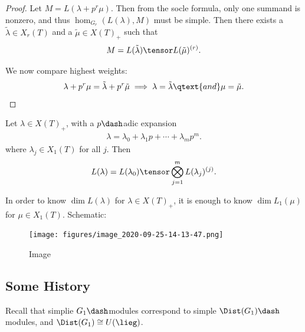 \begin{proof}

Let \(M = L(\lambda + p^r \mu)\). Then from the socle formula, only one
summand is nonzero, and thus \(\hom_{G_r}(L(\lambda), M)\) must be
simple. Then there exists a \(\tilde \lambda \in X_r(T)\) and a
\(\tilde \mu \in X(T)_+\) such that
\begin{align*}  
M = L(\tilde \lambda) \tensor L(\tilde\mu)^{(r)}
.\end{align*}

We now compare highest weights:
\begin{align*}  
\lambda + p^r \mu = \tilde \lambda + p^r \tilde \mu \implies \lambda = \tilde \lambda \qtext{and} \mu = \tilde \mu
.\end{align*}

\end{proof}

\begin{theorem}[Steinberg]

Let \(\lambda \in X(T)_+\), with a \(p\dash\)adic expansion
\begin{align*}  
\lambda = \lambda_0 + \lambda_1 p + \cdots + \lambda_m p^m
.\end{align*} where \(\lambda_j \in X_1(T)\) for all \(j\). Then
\begin{align*}  
L(\lambda) = L(\lambda_0) \tensor \bigotimes_{j=1}^m L(\lambda_j)^{(j)}
.\end{align*}

\end{theorem}

\begin{corollary}[?]

In order to know \(\dim L(\lambda)\) for \(\lambda \in X(T)_+\), it is
enough to know \(\dim L_1(\mu)\) for \(\mu \in X_1(T)\). Schematic:

\begin{figure}
\centering
\texttt{[image: figures/image\_2020-09-25-14-13-47.png]}
\caption{Image}
\end{figure}

\end{corollary}

\hypertarget{some-history}{%
\subsection{Some History}\label{some-history}}

Recall that simplie \(G_1\dash\)modules correspond to simple
\(\Dist(G_1)\dash\)modules, and \(\Dist(G_1) \cong U(\lieg)\).

